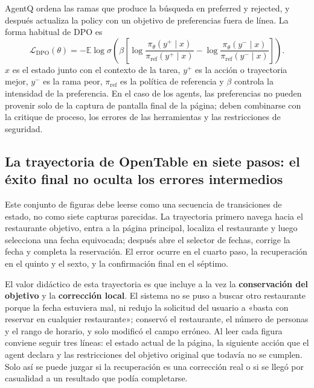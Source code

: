 AgentQ ordena las ramas que produce la búsqueda en preferred y rejected, y después actualiza la policy con un objetivo de preferencias fuera de línea. La forma habitual de DPO es
\[
\mathcal{L}_{\text{DPO}}(\theta)
=-\mathbb{E}\log\sigma\!\left(
\beta\left[
\log\frac{\pi_\theta(y^+\mid x)}{\pi_{\text{ref}}(y^+\mid x)}-
\log\frac{\pi_\theta(y^-\mid x)}{\pi_{\text{ref}}(y^-\mid x)}
\right]\right).
\]
$x$ es el estado junto con el contexto de la tarea, $y^+$ es la acción o trayectoria mejor, $y^-$ es la rama peor, $\pi_{\text{ref}}$ es la política de referencia y $\beta$ controla la intensidad de la preferencia. En el caso de los agents, las preferencias no pueden provenir solo de la captura de pantalla final de la página; deben combinarse con la critique de proceso, los errores de las herramientas y las restricciones de seguridad.



\subsection{La trayectoria de OpenTable en siete pasos: el éxito final no oculta los errores intermedios}

Este conjunto de figuras debe leerse como una secuencia de transiciones de estado, no como siete capturas parecidas. La trayectoria primero navega hacia el restaurante objetivo, entra a la página principal, localiza el restaurante y luego selecciona una fecha equivocada; después abre el selector de fechas, corrige la fecha y completa la reservación. El error ocurre en el cuarto paso, la recuperación en el quinto y el sexto, y la confirmación final en el séptimo.

El valor didáctico de esta trayectoria es que incluye a la vez la \textbf{conservación del objetivo} y la \textbf{corrección local}. El sistema no se puso a buscar otro restaurante porque la fecha estuviera mal, ni redujo la solicitud del usuario a «basta con reservar en cualquier restaurante»; conservó el restaurante, el número de personas y el rango de horario, y solo modificó el campo erróneo. Al leer cada figura conviene seguir tres líneas: el estado actual de la página, la siguiente acción que el agent declara y las restricciones del objetivo original que todavía no se cumplen. Solo así se puede juzgar si la recuperación es una corrección real o si se llegó por casualidad a un resultado que podía completarse.

